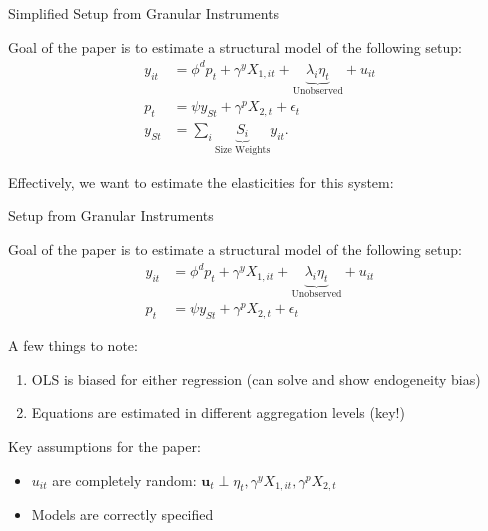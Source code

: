 \documentclass[notes,11pt, aspectratio=169]{beamer}
\newenvironment{wideitemize}{\itemize\addtolength{\itemsep}{10pt}}{\enditemize}
\begin{document}
\begin{frame}{Simplified Setup from Granular Instruments}
  \begin{wideitemize}
  \item Goal of the paper is to estimate a structural model of the following setup:
    \begin{align}
      y_{it} &= \phi^{d}p_{t} + \gamma^{y} X_{1,it} + \underbrace{\lambda_{i}\eta_{t}}_{\text{Unobserved}} + u_{it}\\
      p_{t}  &= \psi y_{St} + \gamma^{p} X_{2,t} + \epsilon_{t}\\
      y_{St} &= \sum_{i}\underbrace{S_{i}}_{\text{Size Weights}}y_{it}.
    \end{align}
  \item Effectively, we want to estimate the elasticities for this system:
  \end{wideitemize}
\end{frame}

\begin{frame}{ Setup from Granular Instruments}
  \begin{wideitemize}
  \item Goal of the paper is to estimate a structural model of the following setup:
    \begin{align}
      y_{it} &= \phi^{d}p_{t} + \gamma^{y} X_{1,it} + \underbrace{\lambda_{i}\eta_{t}}_{\text{Unobserved}} + u_{it}\\
      p_{t}  &= \psi y_{St} + \gamma^{p} X_{2,t} + \epsilon_{t}
    \end{align}
  \item A few things to note:
    \begin{enumerate}
    \item OLS is biased for either regression (can solve and show endogeneity bias)
    \item Equations are estimated in different aggregation levels (key!)
    \end{enumerate}
  \item Key assumptions for the paper:
    \begin{itemize}
    \item $u_{it}$ are completely random: $\boldsymbol{u}_{t} \perp \eta_{t},\gamma^{y} X_{1,it}, \gamma^{p} X_{2,t}$
    \item Models are correctly specified
    \end{itemize}
  \end{wideitemize}
\end{frame}
\end{document}
